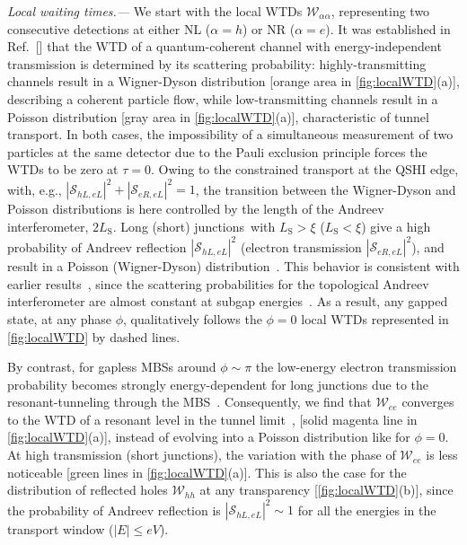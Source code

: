 \documentclass[aps,prl,amsmath,twocolumn,floatfix,superscriptaddress,longbibliography,footinbib]{revtex4-1}
\newcommand{\red}[1]{\textcolor{red}{#1}}
\begin{document}
\textit{Local waiting times.---} We start with the local WTDs $\mathcal{W}_{\alpha\alpha}$, representing two consecutive detections at either NL ($\alpha=h$) or NR ($\alpha=e$). 
%
It was established in Ref.~[] that the WTD of a quantum-coherent channel with energy-independent transmission is determined by its scattering probability: highly-transmitting channels result in a Wigner-Dyson distribution [orange area in \cref{fig:localWTD}(a)], describing a coherent particle flow, while low-transmitting channels result in a Poisson distribution [gray area in \cref{fig:localWTD}(a)], characteristic of tunnel transport. In both cases, the impossibility of a simultaneous measurement of two particles at the same detector due to the Pauli exclusion principle forces the WTDs to be zero at $\tau=0$. 
%
Owing to the constrained transport at the QSHI edge, with, e.g., $|\mathcal{S}_{hL,eL}|^2+|\mathcal{S}_{eR,eL}|^2=1$, the transition between the Wigner-Dyson and Poisson distributions is here controlled by the length of the Andreev interferometer, $2L_\text{S}$. Long (short) junctions~\footnotemark[2] with $L_\text{S}>\xi$ ($L_\text{S}<\xi$) give a high probability of Andreev reflection $|\mathcal{S}_{hL,eL}|^2$ (electron transmission $|\mathcal{S}_{eR,eL}|^2$), and result in a Poisson (Wigner-Dyson) distribution~\cite{SM}. This behavior is consistent with earlier results~\cite{Haack2014,Mi2018,Schulz2022}, since the scattering probabilities for the topological Andreev interferometer are almost constant at subgap energies~\cite{SM}.
%
As a result, any gapped state, at any phase $\phi$, qualitatively follows the $\phi=0$ local WTDs represented in \cref{fig:localWTD} by dashed lines. 

By contrast, for gapless MBSs around $\phi\sim\pi$ the low-energy electron transmission probability becomes strongly energy-dependent for long junctions due to the resonant-tunneling through the MBS~\cite{SM,Cayao2022}. Consequently, we find that $\mathcal{W}_{ee}$ converges to the WTD of a resonant level in the tunnel limit~\cite{Haack2014}, [solid magenta line in \cref{fig:localWTD}(a)], instead of evolving into a Poisson distribution like for $\phi=0$. 
%
At high transmission (short junctions), the variation with the phase of $\mathcal{W}_{ee}$ is less noticeable [green lines in \cref{fig:localWTD}(a)]. This is also the case for the distribution of reflected holes $\mathcal{W}_{hh}$ at any transparency [\cref{fig:localWTD}(b)], since the probability of Andreev reflection is $|\mathcal{S}_{hL,eL}|^2\sim1$ for all the energies in the transport window ($|E|\leq eV$). 
\end{document}
